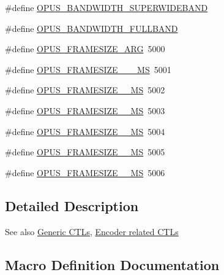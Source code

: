 \begin{DoxyCompactItemize}
\#define \hyperlink{group__opus__ctlvalues_ga41f86df35af0033a7361895da88671c1}{O\+P\+U\+S\+\_\+\+B\+A\+N\+D\+W\+I\+D\+T\+H\+\_\+\+S\+U\+P\+E\+R\+W\+I\+D\+E\+B\+A\+ND}
\item 
\#define \hyperlink{group__opus__ctlvalues_ga74cb052d8ec36cbcc9708c417558ebdd}{O\+P\+U\+S\+\_\+\+B\+A\+N\+D\+W\+I\+D\+T\+H\+\_\+\+F\+U\+L\+L\+B\+A\+ND}
\item 
\#define \hyperlink{group__opus__ctlvalues_ga0371f264203138ca92a3705c9c0ac39d}{O\+P\+U\+S\+\_\+\+F\+R\+A\+M\+E\+S\+I\+Z\+E\+\_\+\+A\+RG}~5000
\item 
\#define \hyperlink{group__opus__ctlvalues_ga4696f62216f4afb1493471bb4c25baea}{O\+P\+U\+S\+\_\+\+F\+R\+A\+M\+E\+S\+I\+Z\+E\+\_\+\_\+\_\+\+MS}~5001
\item 
\#define \hyperlink{group__opus__ctlvalues_gab2e88add9d69a0828ca23efc7bbb41be}{O\+P\+U\+S\+\_\+\+F\+R\+A\+M\+E\+S\+I\+Z\+E\+\_\+\_\+\+MS}~5002
\item 
\#define \hyperlink{group__opus__ctlvalues_ga39d5606c61c4cd21e6ae2f1259a1f15f}{O\+P\+U\+S\+\_\+\+F\+R\+A\+M\+E\+S\+I\+Z\+E\+\_\+\_\+\+MS}~5003
\item 
\#define \hyperlink{group__opus__ctlvalues_gacfce47959bdaa8581fdc68cec3be2bfb}{O\+P\+U\+S\+\_\+\+F\+R\+A\+M\+E\+S\+I\+Z\+E\+\_\+\_\+\+MS}~5004
\item 
\#define \hyperlink{group__opus__ctlvalues_ga268935a23f6d8a8ae6bb3d11ac6ae172}{O\+P\+U\+S\+\_\+\+F\+R\+A\+M\+E\+S\+I\+Z\+E\+\_\+\_\+\+MS}~5005
\item 
\#define \hyperlink{group__opus__ctlvalues_gac8178be7f02dc908c022cc3bb5c6c252}{O\+P\+U\+S\+\_\+\+F\+R\+A\+M\+E\+S\+I\+Z\+E\+\_\+\_\+\+MS}~5006
\end{DoxyCompactItemize}


\subsection{Detailed Description}
\begin{DoxySeeAlso}{See also}
\hyperlink{group__opus__genericctls}{Generic C\+T\+Ls}, \hyperlink{group__opus__encoderctls}{Encoder related C\+T\+Ls} 
\end{DoxySeeAlso}


\subsection{Macro Definition Documentation}
\mbox{\label{group__opus__ctlvalues_ga5909f7cb35c04f1110026c6889edd345}} 
